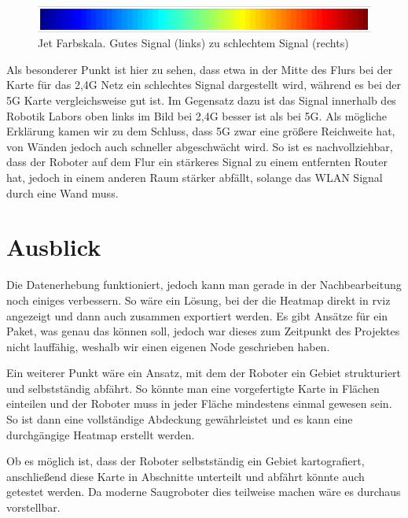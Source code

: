 \documentclass{scrartcl}%
\begin{document}
\begin{figure}[h!]
	\centering
	\includegraphics[width=\textwidth]{bilder/JetFarbskala.png}
	\caption{Jet Farbskala. Gutes Signal (links) zu schlechtem Signal (rechts)}
	\label{skala}
\end{figure}

Als besonderer Punkt ist hier zu sehen, dass etwa in der Mitte des Flurs bei der Karte für das 2,4G Netz ein schlechtes Signal dargestellt wird, während es bei der 5G Karte vergleichsweise gut ist. Im Gegensatz dazu ist das Signal innerhalb des Robotik Labors oben links im Bild bei 2,4G besser ist als bei 5G. Als mögliche Erklärung kamen wir zu dem Schluss, dass 5G zwar eine größere Reichweite hat, von Wänden jedoch auch schneller abgeschwächt wird. So ist es nachvollziehbar, dass der Roboter auf dem Flur ein stärkeres Signal zu einem entfernten Router hat, jedoch in einem anderen Raum stärker abfällt, solange das WLAN Signal durch eine Wand muss.


\newpage
\section{Ausblick}
Die Datenerhebung funktioniert, jedoch kann man gerade in der Nachbearbeitung noch einiges verbessern. So wäre ein Lösung, bei der die Heatmap direkt in rviz angezeigt und dann auch zusammen exportiert werden. Es gibt Ansätze für ein Paket, was genau das können soll, jedoch war dieses zum Zeitpunkt des Projektes nicht lauffähig, weshalb wir einen eigenen Node geschrieben haben.

Ein weiterer Punkt wäre ein Ansatz, mit dem der Roboter ein Gebiet strukturiert und selbstständig abfährt. So könnte man eine vorgefertigte Karte in Flächen einteilen und der Roboter muss in jeder Fläche mindestens einmal gewesen sein. So ist dann eine vollständige Abdeckung gewährleistet und es kann eine durchgängige Heatmap erstellt werden.

Ob es möglich ist, dass der Roboter selbstständig ein Gebiet kartografiert, anschließend diese Karte in Abschnitte unterteilt und abfährt könnte auch getestet werden. Da moderne Saugroboter dies teilweise machen wäre es durchaus vorstellbar.

\newpage
\begin{flushleft}
	\printbibliography
\end{flushleft}
\end{document}

